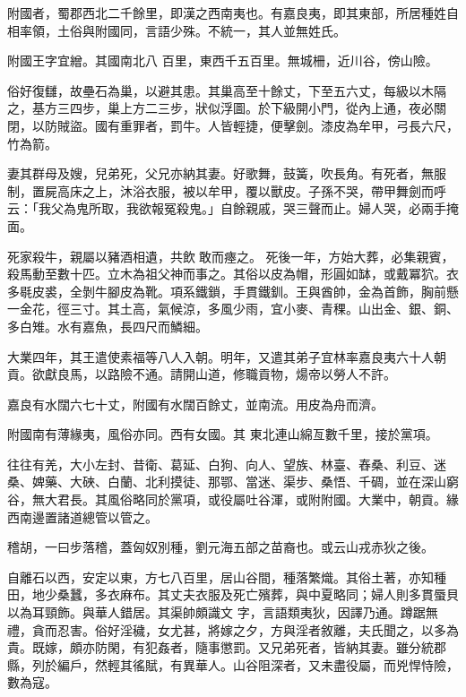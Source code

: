 \begin{pinyinscope}
 附國者，蜀郡西北二千餘里，即漢之西南夷也。有嘉良夷，即其東部，所居種姓自相率領，土俗與附國同，言語少殊。不統一，其人並無姓氏。



 附國王字宜繒。其國南北八
 百里，東西千五百里。無城柵，近川谷，傍山險。



 俗好復讎，故壘石為巢，以避其患。其巢高至十餘丈，下至五六丈，每級以木隔之，基方三四步，巢上方二三步，狀似浮圖。於下級開小門，從內上通，夜必關閉，以防賊盜。國有重罪者，罰牛。人皆輕捷，便擊劍。漆皮為牟甲，弓長六尺，竹為箭。



 妻其群母及嫂，兒弟死，父兄亦納其妻。好歌舞，鼓簧，吹長角。有死者，無服制，置屍高床之上，沐浴衣服，被以牟甲，覆以獸皮。子孫不哭，帶甲舞劍而呼云：「我父為鬼所取，我欲報冤殺鬼。」自餘親戚，哭三聲而止。婦人哭，必兩手掩面。



 死家殺牛，親屬以豬酒相遺，共飲敢而瘞之。
 死後一年，方始大葬，必集親賓，殺馬動至數十匹。立木為祖父神而事之。其俗以皮為帽，形圓如缽，或戴冪狖。衣多毼皮裘，全剝牛腳皮為靴。項系鐵鎖，手貫鐵釧。王與酋帥，金為首飾，胸前懸一金花，徑三寸。其土高，氣候涼，多風少雨，宜小麥、青稞。山出金、銀、銅、多白雉。水有嘉魚，長四尺而鱗細。



 大業四年，其王遣使素福等八人入朝。明年，又遣其弟子宜林率嘉良夷六十人朝貢。欲獻良馬，以路險不通。請開山道，修職貢物，煬帝以勞人不許。



 嘉良有水闊六七十丈，附國有水闊百餘丈，並南流。用皮為舟而濟。



 附國南有薄緣夷，風俗亦同。西有女國。其
 東北連山綿亙數千里，接於黨項。



 往往有羌，大小左封、昔衛、葛延、白狗、向人、望族、林臺、舂桑、利豆、迷桑、婢藥、大硤、白蘭、北利摸徒、那鄂、當迷、渠步、桑悟、千碉，並在深山窮谷，無大君長。其風俗略同於黨項，或役屬吐谷渾，或附附國。大業中，朝貢。緣西南邊置諸道總管以管之。



 稽胡，一曰步落稽，蓋匈奴別種，劉元海五部之苗裔也。或云山戎赤狄之後。



 自離石以西，安定以東，方七八百里，居山谷間，種落繁熾。其俗土著，亦知種田，地少桑蠶，多衣麻布。其丈夫衣服及死亡殯葬，與中夏略同；婦人則多貫蜃貝以為耳頸飾。與華人錯居。其渠帥頗識文
 字，言語類夷狄，因譯乃通。蹲踞無禮，貪而忍害。俗好淫穢，女尤甚，將嫁之夕，方與淫者敘離，夫氏聞之，以多為貴。既嫁，頗亦防閑，有犯姦者，隨事懲罰。又兄弟死者，皆納其妻。雖分統郡縣，列於編戶，然輕其徭賦，有異華人。山谷阻深者，又未盡役屬，而兇悍恃險，數為寇。




\end{pinyinscope}
